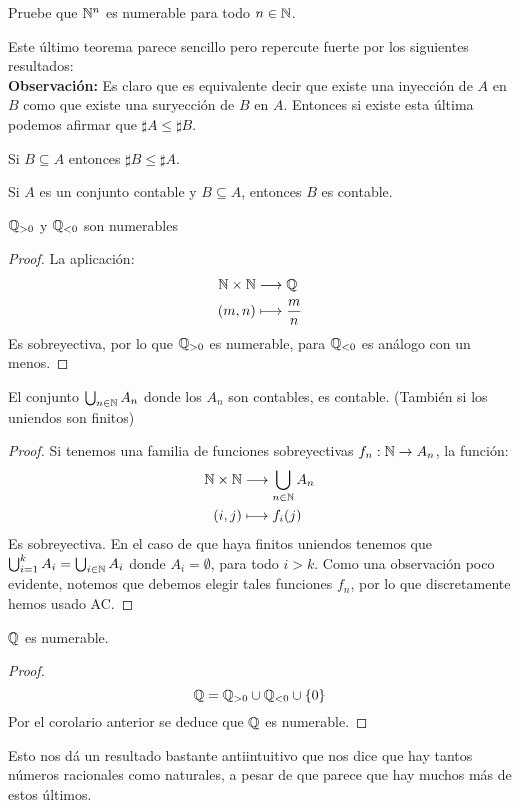 \documentclass[12pt,a4paper]{book}
\begin{document}
\begin{ej} Pruebe que $\mathbb{N}^n$ es numerable para todo $n \in \mathbb{N}$.\end{ej}
Este último teorema parece sencillo pero repercute fuerte por los siguientes resultados:\\[0.5cm]
\textbf{Observación:} Es claro que es equivalente decir que existe una inyección de $A$ en $B$ como que existe una suryección de $B$ en $A$. Entonces si existe esta última podemos afirmar que $\sharp A \leq \sharp B$.
\begin{ej} Si $B \subseteq A$ entonces $\sharp B \leq \sharp A$.\end{ej}
\begin{ej}Si $A$ es un conjunto contable y $B \subseteq A$, entonces $B$ es contable.\end{ej}
\begin{cor}
$\mathbb{Q}_{>0}$ y $\mathbb{Q}_{<0}$ son numerables
\begin{proof}
La aplicación:
\begin{align*}
\mathbb{N} \times \mathbb{N} &\longrightarrow \mathbb{Q} \\
(m,n) &\longmapsto \frac{m}{n}
\end{align*}
Es sobreyectiva, por lo que $\mathbb{Q}_{>0}$ es numerable, para $\mathbb{Q}_{<0}$ es análogo con un menos.
\end{proof}
\end{cor}
\begin{cor}
El conjunto $\bigcup_{n \in \mathbb{N}} A_n$ donde los $A_n$ son contables, es contable. (También si los uniendos son finitos)
\begin{proof}
Si tenemos una familia de funciones sobreyectivas $f_n: \mathbb{N} \rightarrow A_n$, la función:
\begin{align*}
\mathbb{N} \times \mathbb{N} &\longrightarrow \bigcup_{n \in \mathbb{N}} A_n \\
(i,j) &\longmapsto f_i(j)
\end{align*}
Es sobreyectiva. En el caso de que haya finitos uniendos tenemos que $\bigcup_{i=1}^k A_i = \bigcup_{i \in \mathbb{N}} A_i$ donde $A_i = \emptyset$, para todo $i > k$. Como una observación poco evidente, notemos que debemos elegir tales funciones $f_n$, por lo que discretamente hemos usado AC.
\end{proof}
\end{cor}
\begin{cor}
$\mathbb{Q}$ es numerable.
\begin{proof}
$$\mathbb{Q} = \mathbb{Q}_{>0} \cup \mathbb{Q}_{<0} \cup \{0\}$$
Por el corolario anterior se deduce que $\mathbb{Q}$ es numerable.
\end{proof}
\end{cor}
Esto nos dá un resultado bastante antiintuitivo que nos dice que hay tantos números racionales como naturales, a pesar de que parece que hay muchos más de estos últimos.
\end{document}
